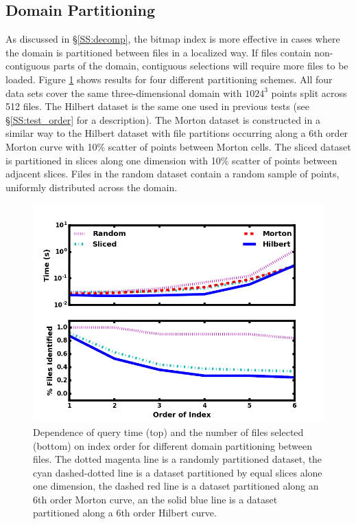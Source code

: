\documentclass[apjl]{emulateapj}
\begin{document}
\subsection{Domain Partitioning}\label{SS:test_decomp}
%
As discussed in \S\ref{SS:decomp}, the bitmap index is more effective in cases where the domain is partitioned between files in a localized way. If files contain non-contiguous parts of the domain, contiguous selections will require more files to be loaded. Figure \ref{fig:test_decomp} shows results for four different partitioning schemes. All four data sets cover the same three-dimensional domain with $1024^3$ points split across 512 files. The Hilbert dataset is the same one used in previous tests (see \S\ref{SS:test_order} for a description). The Morton dataset is constructed in a similar way to the Hilbert dataset with file partitions occurring along a 6th order Morton curve with 10\% scatter of points between Morton cells. The sliced dataset is partitioned in slices along one dimension with 10\% scatter of points between adjacent slices. Files in the random dataset contain a random sample of points, uniformly distributed across the domain.
%
\begin{figure}[hbpt]
\begin{center}
\includegraphics[width=\columnwidth,keepaspectratio]{../images/vary_decomp_np1024_nf512_or0.png}
\caption{Dependence of query time (top) and the number of files selected (bottom) on index order for different domain partitioning between files. The dotted magenta line is a randomly partitioned dataset, the cyan dashed-dotted line is a dataset partitioned by equal slices alone one dimension, the dashed red line is a dataset partitioned along an 6th order Morton curve, an the solid blue line is a dataset partitioned along a 6th order Hilbert curve.}
\label{fig:test_decomp}
\end{center}
\end{figure}
\end{document}
